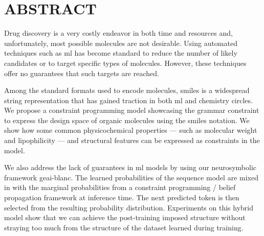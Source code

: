 \documentclass[../Document.tex]{subfiles}
\begin{document}

\chapter*{ABSTRACT}\thispagestyle{headings}

Drug discovery is a very costly endeavor in both time and resources and, unfortunately, most possible molecules are not desirable.
Using automated techniques such as \acrlong{ml} has become standard to reduce the number of likely candidates or to target specific types of molecules.
However, these techniques offer no guarantees that such targets are reached.

Among the standard formats used to encode molecules, \acrshort{smiles} is a widespread string representation that has gained traction in both \acrlong{ml} and chemistry circles.
We propose a constraint programming model showcasing the grammar constraint to express the design space of organic molecules using the \acrshort{smiles} notation.
We show how some common physicochemical properties --- such as molecular weight and lipophilicity --- and structural features can be expressed as constraints in the model.

We also address the lack of guarantees in \acrlong{ml} models by using our neurosymbolic framework \acrshort{geai-blanc}.
The learned probabilities of the sequence model are mixed in with the marginal probabilities from a constraint programming / belief propagation framework at inference time.
The next predicted token is then selected from the resulting probability distribution.
Experiments on this hybrid model show that we can achieve the post-training imposed structure without straying too much from the structure of the dataset learned during training.
\end{document}

